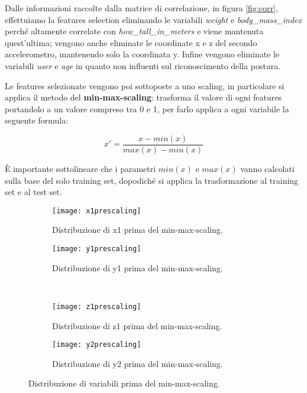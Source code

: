 Dalle informazioni raccolte dalla matrice di correlazione, in figura \ref{fig:corr}, effettuiamo la features selection eliminando le variabili \textit{weight} e \textit{body\_mass\_index} perché altamente correlate con \textit{how\_tall\_in\_meters} e viene mantenuta quest'ultima; vengono anche eliminate le coordinate x e z del secondo accelerometro, mantenendo solo la coordinata y. Infine vengono eliminate le variabili \textit{user} e \textit{age} in quanto non influenti sul riconoscimento della postura.

Le features selezionate vengono poi sottoposte a uno scaling, in particolare si applica il metodo del \textbf{min-max-scaling}: trasforma il valore di ogni features portandolo a un valore compreso tra 0 e 1, per farlo applica a ogni variabile la seguente formula:

\begin{equation}
x' = \frac{x-min(x)}{max(x)-min(x)}
\end{equation}

È importante sottolineare che i parametri $min(x)$ e $max(x)$ vanno calcolati sulla base del solo training set, dopodiché si applica la trasformazione al training set e al test set.

\begin{figure}[ht]
    \centering
    \begin{subfigure}[t]{0.4\textwidth}
        \centering\texttt{[image: x1prescaling]}
        \caption{Distribuzione di x1 prima del min-max-scaling.}
        \label{fig:distprescaling:x1}
    \end{subfigure}
    \begin{subfigure}[t]{0.4\textwidth}
        \centering\texttt{[image: y1prescaling]}
        \caption{Distribuzione di y1 prima del min-max-scaling.}
        \label{fig:distprescaling:y1}
    \end{subfigure}
    \\
    \begin{subfigure}[t]{0.4\textwidth}
        \centering\texttt{[image: z1prescaling]}
        \caption{Distribuzione di z1 prima del min-max-scaling.}
        \label{fig:distprescaling:z1}
    \end{subfigure}
    \begin{subfigure}[t]{0.4\textwidth}
        \centering\texttt{[image: y2prescaling]}
        \caption{Distribuzione di y2 prima del min-max-scaling.}
        \label{fig:distprescaling:y2}
    \end{subfigure}
    \caption{Distribuzione di variabili prima del min-max-scaling.}
    \label{fig:distprescaling}
\end{figure}

